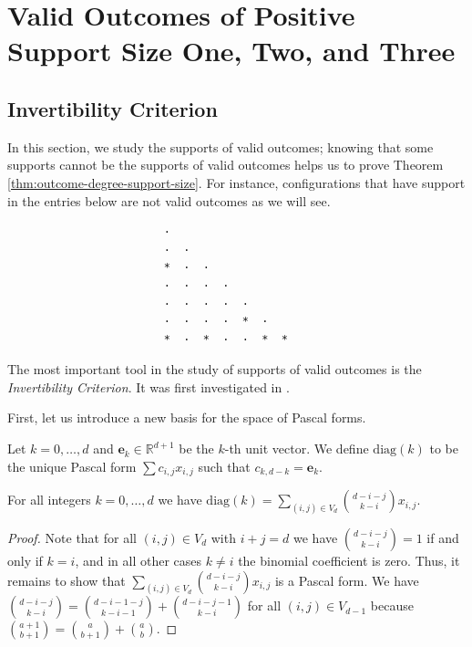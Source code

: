\chapter{Valid Outcomes of Positive Support Size One, Two, and Three}

\section{Invertibility Criterion}

In this section, we study the supports of valid outcomes; knowing that some supports cannot be the supports of valid outcomes helps us to prove Theorem \ref{thm:outcome-degree-support-size}. For instance, configurations that have support in the entries below are not valid outcomes as we will see.
\begin{verbatim}
                        ·  
                        ·  · 
                        *  ·  · 
                        ·  ·  ·  · 
                        ·  ·  ·  ·  · 
                        ·  ·  ·  ·  *  · 
                        *  ·  *  ·  ·  *  *
\end{verbatim}
The most important tool in the study of supports of valid outcomes is the \emph{Invertibility Criterion}. It was first investigated in \cite{bik2022classifying}. 

First, let us introduce a new basis for the space of Pascal forms.

\begin{definition}
    Let \( k = 0, \dots, d \) and \( \mathbf e_k \in \mathbb{R}^{d+1} \) be the \( k \)-th unit vector. We define \( \mathrm{diag}(k) \) to be the unique Pascal form \( \sum c_{i,j}x_{i,j} \) such that \( c_{k,d-k} = \mathbf e_k \).
\end{definition}

\begin{proposition}\label{prop:diagonal-basis-324324324231}
    For all integers \( k = 0, \dots, d \) we have \( \mathrm{diag}(k)  = \sum_{(i,j) \in V_d}\binom{d - i - j}{k-i} x_{i,j} \).
\end{proposition}



\begin{proof}
    Note that for all \( (i,j) \in V_d \) with \( i+j = d \) we have \( \binom{d - i - j}{k-i} = 1 \) if and only if \( k= i \), and in all other cases \( k \neq i \) the binomial coefficient is zero. Thus, it remains to show that \( \sum_{(i,j) \in V_d}\binom{d - i - j}{k-i} x_{i,j} \) is a Pascal form. We have \(  \binom{d-i-j}{k-i} = \binom{d-i-1-j}{k-i-1} + \binom{d-i-j-1}{k-i} \)
    for all \( (i,j) \in V_{d-1} \) because \( \binom{a+1}{b+1} = \binom{a}{b+1} + \binom{a}{b}\).
\end{proof}

